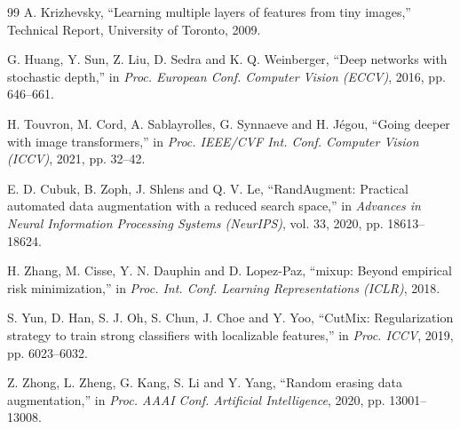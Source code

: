 \documentclass[9pt, conference, a4paper, compsocconf]{IEEEtran}
\begin{document}
\begin{thebibliography}{99}
 A. Krizhevsky, ``Learning multiple layers of features from tiny
images,'' Technical Report, University of Toronto, 2009.

 G. Huang, Y. Sun, Z. Liu, D. Sedra and K. Q.
Weinberger, ``Deep networks with stochastic depth,'' in \emph{Proc. European
Conf. Computer Vision (ECCV)}, 2016, pp. 646--661.

 H. Touvron, M. Cord, A. Sablayrolles, G. Synnaeve and
H. J\'egou, ``Going deeper with image transformers,'' in \emph{Proc. IEEE/CVF
Int. Conf. Computer Vision (ICCV)}, 2021, pp. 32--42.

 E. D. Cubuk, B. Zoph, J. Shlens and Q. V. Le,
``RandAugment: Practical automated data augmentation with a reduced search
space,'' in \emph{Advances in Neural Information Processing Systems (NeurIPS)},
vol. 33, 2020, pp. 18613--18624.

 H. Zhang, M. Cisse, Y. N. Dauphin and D. Lopez-Paz,
``mixup: Beyond empirical risk minimization,'' in \emph{Proc. Int. Conf.
Learning Representations (ICLR)}, 2018.

 S. Yun, D. Han, S. J. Oh, S. Chun, J. Choe and Y. Yoo,
``CutMix: Regularization strategy to train strong classifiers with localizable
features,'' in \emph{Proc. ICCV}, 2019, pp. 6023--6032.

 Z. Zhong, L. Zheng, G. Kang, S. Li and Y. Yang,
``Random erasing data augmentation,'' in \emph{Proc. AAAI Conf. Artificial
Intelligence}, 2020, pp. 13001--13008.

\end{thebibliography}
\end{document}

